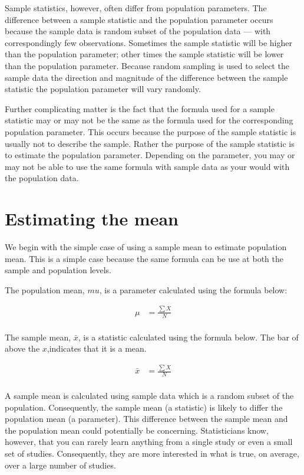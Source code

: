 \documentclass[
]{krantz}
\begin{document}
Sample statistics, however, often differ from population parameters. The difference between a sample statistic and the population parameter occurs because the sample data is random subset of the population data --- with correspondingly few observations. Sometimes the sample statistic will be higher than the population parameter; other times the sample statistic will be lower than the population parameter. Because random sampling is used to select the sample data the direction and magnitude of the difference between the sample statistic the population parameter will vary randomly.

Further complicating matter is the fact that the formula used for a sample statistic may or may not be the same as the formula used for the corresponding population parameter. This occurs because the purpose of the sample statistic is usually not to describe the sample. Rather the purpose of the sample statistic is to estimate the population parameter. Depending on the parameter, you may or may not be able to use the same formula with sample data as your would with the population data.

\hypertarget{estimating-the-mean}{%
\section{Estimating the mean}\label{estimating-the-mean}}

We begin with the simple case of using a sample mean to estimate population mean. This is a simple case because the same formula can be use at both the sample and population levels.

The population mean, \(mu\), is a parameter calculated using the formula below:

\[
\begin{aligned} 
\mu &= \frac{\sum{X}}{N} \\
\end{aligned} 
\]

The sample mean, \(\bar{x}\), is a statistic calculated using the formula below. The bar of above the \(x\),indicates that it is a mean.

\[
\begin{aligned} 
\bar{x} &= \frac{\sum{X}}{N} \\
\end{aligned} 
\]

A sample mean is calculated using sample data which is a random subset of the population. Consequently, the sample mean (a statistic) is likely to differ the population mean (a parameter). This difference between the sample mean and the population mean could potentially be concerning. Statisticians know, however, that you can rarely learn anything from a single study or even a small set of studies. Consequently, they are more interested in what is true, on average, over a large number of studies.
\end{document}

